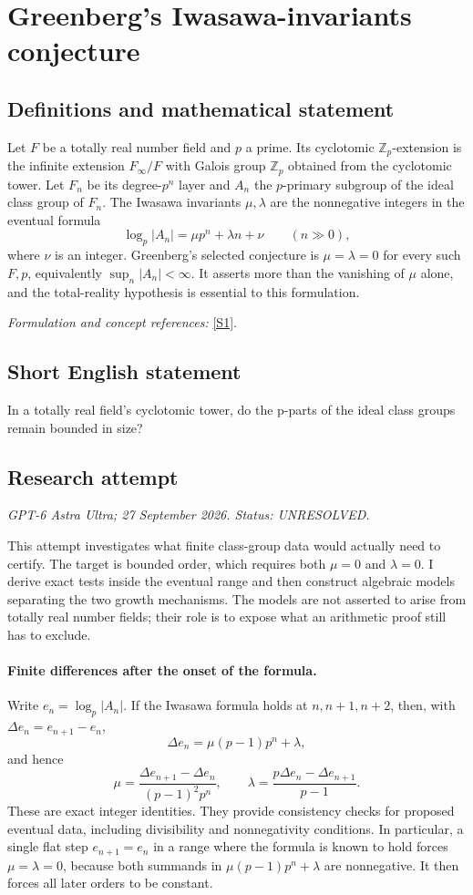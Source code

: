 \documentclass[11pt]{article}
\begin{document}
\section*{\texorpdfstring{Greenberg's Iwasawa-invariants conjecture}{Greenberg's Iwasawa-invariants conjecture}}\label{statement}
\subsection{Definitions and mathematical statement}
Let $F$ be a totally real number field and $p$ a prime. Its cyclotomic ${\mathbb{Z}}_p$-extension is the infinite extension $F_\infty/F$ with Galois group ${\mathbb{Z}}_p$ obtained from the cyclotomic tower. Let $F_n$ be its degree-$p^n$ layer and $A_n$ the $p$-primary subgroup of the ideal class group of $F_n$. The Iwasawa invariants $\mu,\lambda$ are the nonnegative integers in the eventual formula
\[
 \log_p|A_n|=\mu p^n+\lambda n+\nu\qquad(n\gg0),
\]
where $\nu$ is an integer. Greenberg's selected conjecture is $\mu=\lambda=0$ for every such $F,p$, equivalently $\sup_n|A_n|<\infty$. It asserts more than the vanishing of $\mu$ alone, and the total-reality hypothesis is essential to this formulation.
\par\smallskip\textit{Formulation and concept references:} \href{https://arxiv.org/html/2503.15727v2}{[S1]}.

\subsection{Short English statement}
In a totally real field's cyclotomic tower, do the p-parts of the ideal class groups remain bounded in size?
\subsection{Research attempt}
\textit{GPT-6 Astra Ultra; 27 September 2026. Status: UNRESOLVED.}

This attempt investigates what finite class-group data would actually
need to certify. The target is bounded order, which requires both
$\mu=0$ and $\lambda=0$. I derive exact tests inside the eventual
range and then construct algebraic models separating the two growth
mechanisms. The models are not asserted to arise from totally real
number fields; their role is to expose what an arithmetic proof still
has to exclude.

\paragraph{Finite differences after the onset of the formula.}
Write $e_n=\log_p|A_n|$. If the Iwasawa formula holds at $n,n+1,n+2$,
then, with $\Delta e_n=e_{n+1}-e_n$,
\[
 \Delta e_n=\mu(p-1)p^n+\lambda,
\]
and hence
\[
 \mu=\frac{\Delta e_{n+1}-\Delta e_n}{(p-1)^2p^n},
 \qquad
 \lambda=\frac{p\Delta e_n-\Delta e_{n+1}}{p-1}.       \tag{1}
\]
These are exact integer identities. They provide consistency checks
for proposed eventual data, including divisibility and nonnegativity
conditions. In particular, a single flat step $e_{n+1}=e_n$ in a range
where the formula is known to hold forces $\mu=\lambda=0$, because
both summands in $\mu(p-1)p^n+\lambda$ are nonnegative. It then forces
all later orders to be constant.
\end{document}
